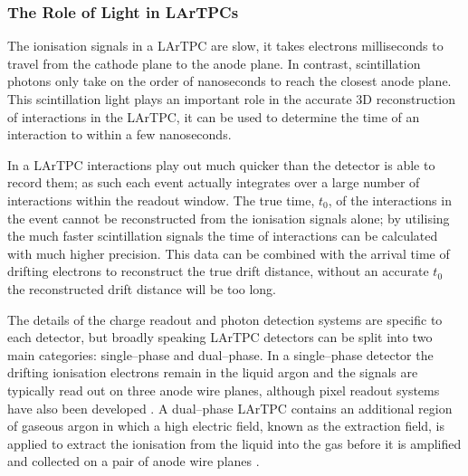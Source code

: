 \subsubsection*{The Role of Light in LArTPCs}

The ionisation signals in a LArTPC are slow, it takes electrons milliseconds to
travel from the cathode plane to the anode plane. In contrast, scintillation 
photons only take on the order of nanoseconds to reach the closest anode 
plane. This scintillation light plays an important role in the accurate 3D 
reconstruction of interactions in the LArTPC, it can be used to determine the
time of an interaction to within a few nanoseconds.

In a LArTPC interactions play out much quicker than the detector is able to 
record them; as such each event actually integrates over a large number of
interactions within the readout window. The true time, $t_0$, of the 
interactions in the event cannot be reconstructed from the ionisation signals 
alone; by utilising the much faster scintillation signals the time of 
interactions can be calculated with much higher precision. 
This data can be combined with the arrival time of drifting electrons to
reconstruct the true drift distance, without an accurate $t_0$ the reconstructed
drift distance will be too long.

\bigskip

The details of the charge readout and photon detection systems are specific to 
each detector, but broadly speaking LArTPC detectors can be split into two 
main categories: single--phase and dual--phase. In a single--phase detector the
drifting ionisation electrons remain in the liquid argon and the signals are 
typically read out on three anode wire planes, although pixel readout systems
have also been developed \cite{TODO}. A dual--phase LArTPC contains an
additional region of gaseous argon in which a high electric field, known as the
extraction field, is applied to extract the ionisation from the liquid into the
gas before it is amplified and collected on a pair of anode wire planes 
\cite{Abi:2020wmh}.

\bigskip

